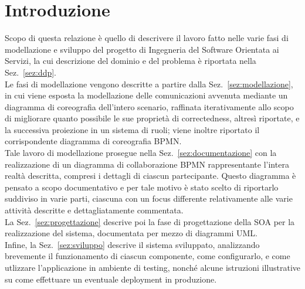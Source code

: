 \documentclass[11pt]{article} %
\begin{document}
\clearpage
\tableofcontents
\thispagestyle{empty}
\newpage

\section{Introduzione}

Scopo di questa relazione è quello di descrivere il lavoro fatto nelle varie fasi di modellazione e sviluppo del progetto di Ingegneria del Software Orientata ai Servizi, la cui descrizione del dominio e del problema è riportata nella Sez.~\ref{sez:ddp}.\\
Le fasi di modellazione vengono descritte a partire dalla Sez.~\ref{sez:modellazione}, in cui viene esposta la modellazione delle comunicazioni avvenuta mediante un diagramma di coreografia dell'intero scenario, raffinata iterativamente allo scopo di migliorare quanto possibile le sue proprietà di correctedness, altresì riportate, e la successiva proiezione in un sistema di ruoli; viene inoltre riportato il corrispondente diagramma di coreografia BPMN.\\
Tale lavoro di modellazione prosegue nella Sez.~\ref{sez:documentazione} con la realizzazione di un diagramma di collaborazione BPMN rappresentante l'intera realtà descritta, compresi i dettagli di ciascun partecipante. Questo diagramma è pensato a scopo documentativo e per tale motivo è stato scelto di riportarlo suddiviso in varie parti, ciascuna con un focus differente relativamente alle varie attività descritte e dettagliatamente commentata.\\
La Sez.~\ref{sez:progettazione} descrive poi la fase di progettazione della SOA per la realizzazione del sistema, documentata per mezzo di diagrammi UML.\\
Infine, la Sez.~\ref{sez:sviluppo} descrive il sistema sviluppato, analizzando brevemente il funzionamento di ciascun componente, come configurarlo, e come utlizzare l'applicazione in ambiente di testing, nonché alcune istruzioni illustrative su come effettuare un eventuale deployment in produzione.

\clearpage
\end{document}
